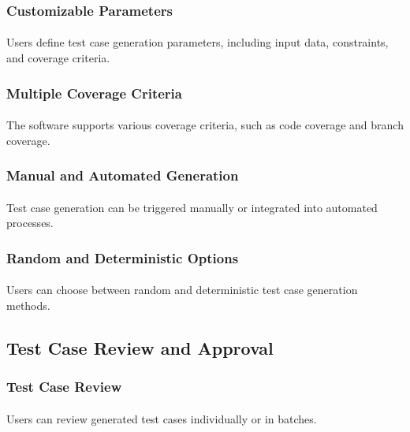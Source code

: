 \documentclass{article}
\begin{document}
\subsubsection{Customizable Parameters}
\paragraph{}
Users define test case generation parameters, including input data, constraints, and
coverage criteria.

\subsubsection{Multiple Coverage Criteria}
\paragraph{}
The software supports various coverage criteria, such as code coverage and branch coverage.

\subsubsection{Manual and Automated Generation}
\paragraph{}
Test case generation can be triggered manually or integrated into automated processes.

\subsubsection{Random and Deterministic Options}
\paragraph{}
Users can choose between random and deterministic test case generation methods.

\subsection{Test Case Review and Approval}
\subsubsection{Test Case Review}
\paragraph{}
Users can review generated test cases individually or in batches.
\end{document}
